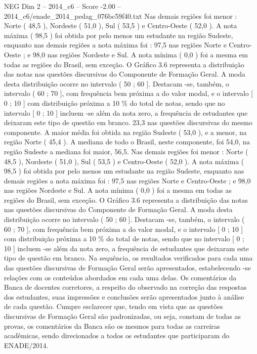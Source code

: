 \begin{textsample}{NEG Dim 2 – 2014\_c6 – Score -2.00 – 2014\_c6/enade\_2014\_pedag\_076bc59f40.txt}
Nas demais regiões foi menor : Norte ( 48,5 ), Nordeste ( 51,0 ), Sul ( 53,5 ) e Centro-Oeste ( 52,0 ).
A nota máxima ( 98,5 ) foi obtida por pelo menos um estudante na região Sudeste, enquanto nas demais regiões a nota máxima foi : 97,5 nas regiões Norte e Centro-Oeste ; e 98,0 nas regiões Nordeste e Sul.
A nota mínima ( 0,0 ) foi a mesma em todas as regiões do Brasil, sem exceção.
O Gráfico 3.6 representa a distribuição das notas nas questões discursivas do Componente de Formação Geral.
A moda desta distribuição ocorre no intervalo ( 50 ; 60 ].
Destacam -se, também, o intervalo ( 60 ; 70 ], com frequência bem próxima a do valor modal, e o intervalo [ 0 ; 10 ] com distribuição próxima a 10 \% do total de notas, sendo que no intervalo [ 0 ; 10 ] incluem -se além da nota zero, a frequência de estudantes que deixaram este tipo de questão em branco. 23,3 nas questões discursivas do mesmo componente.
A maior média foi obtida na região Sudeste ( 53,0 ), e a menor, na região Norte ( 45,4 ).
A mediana de todo o Brasil, neste componente, foi 54,0, na região Sudeste a mediana foi maior, 56,5.
Nas demais regiões foi menor : Norte ( 48,5 ), Nordeste ( 51,0 ), Sul ( 53,5 ) e Centro-Oeste ( 52,0 ).
A nota máxima ( 98,5 ) foi obtida por pelo menos um estudante na região Sudeste, enquanto nas demais regiões a nota máxima foi : 97,5 nas regiões Norte e Centro-Oeste ; e 98,0 nas regiões Nordeste e Sul.
A nota mínima ( 0,0 ) foi a mesma em todas as regiões do Brasil, sem exceção.
O Gráfico 3.6 representa a distribuição das notas nas questões discursivas do Componente de Formação Geral.
A moda desta distribuição ocorre no intervalo ( 50 ; 60 ].
Destacam -se, também, o intervalo ( 60 ; 70 ], com frequência bem próxima a do valor modal, e o intervalo [ 0 ; 10 ] com distribuição próxima a 10 \% do total de notas, sendo que no intervalo [ 0 ; 10 ] incluem -se além da nota zero, a frequência de estudantes que deixaram este tipo de questão em branco.
Na sequência, os resultados verificados para cada uma das questões discursivas de Formação Geral serão apresentados, estabelecendo -se relações com os conteúdos abordados em cada uma delas.
Os comentários da Banca de docentes corretores, a respeito do observado na correção das respostas dos estudantes, suas impressões e conclusões serão apresentados junto à análise de cada questão.
Cumpre esclarecer que, tendo em vista que as questões discursivas de Formação Geral são padronizadas, ou seja, constam de todas as provas, os comentários da Banca são os mesmos para todas as carreiras acadêmicas, sendo direcionados a todos os estudantes que participaram do ENADE/2014.

\end{textsample}
